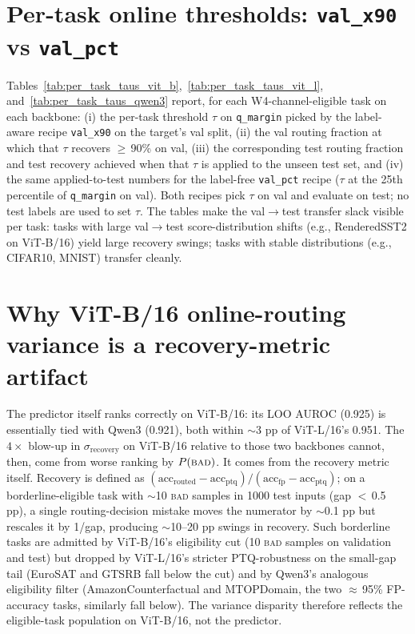 \documentclass{article}
\newcommand{\bad}{\textsc{bad}\xspace}
\begin{document}
\section{Per-task online thresholds: \texttt{val\_x90} vs \texttt{val\_pct}}\label{app:per_task_taus}

Tables~\ref{tab:per_task_taus_vit_b},~\ref{tab:per_task_taus_vit_l}, and~\ref{tab:per_task_taus_qwen3} report, for each W4-channel-eligible task on each backbone: (i) the per-task threshold $\tau$ on \texttt{q\_margin} picked by the label-aware recipe \texttt{val\_x90} on the target's val split, (ii) the val routing fraction at which that $\tau$ recovers $\geq$\,90\% on val, (iii) the corresponding test routing fraction and test recovery achieved when that $\tau$ is applied to the unseen test set, and (iv) the same applied-to-test numbers for the label-free \texttt{val\_pct} recipe ($\tau$ at the 25th percentile of \texttt{q\_margin} on val). Both recipes pick $\tau$ on val and evaluate on test; no test labels are used to set $\tau$. The tables make the val$\to$test transfer slack visible per task: tasks with large val$\to$test score-distribution shifts (e.g., RenderedSST2 on ViT-B/16) yield large recovery swings; tasks with stable distributions (e.g., CIFAR10, MNIST) transfer cleanly.



\section{Why ViT-B/16 online-routing variance is a recovery-metric artifact}\label{app:online_noise}

The predictor itself ranks correctly on ViT-B/16: its LOO AUROC (0.925) is essentially tied with Qwen3 (0.921), both within $\sim$3 pp of ViT-L/16's 0.951. The $4\times$ blow-up in $\sigma_{\text{recovery}}$ on ViT-B/16 relative to those two backbones cannot, then, come from worse ranking by $P(\bad)$. It comes from the recovery metric itself. Recovery is defined as $(\mathrm{acc}_{\text{routed}} - \mathrm{acc}_{\text{ptq}})/(\mathrm{acc}_{\text{fp}} - \mathrm{acc}_{\text{ptq}})$; on a borderline-eligible task with $\sim$10 \bad{} samples in 1000 test inputs (gap $<$\,0.5 pp), a single routing-decision mistake moves the numerator by $\sim$0.1 pp but rescales it by 1/gap, producing $\sim$10--20 pp swings in recovery. Such borderline tasks are admitted by ViT-B/16's eligibility cut (10 \bad{} samples on validation and test) but dropped by ViT-L/16's stricter PTQ-robustness on the small-gap tail (EuroSAT and GTSRB fall below the cut) and by Qwen3's analogous eligibility filter (AmazonCounterfactual and MTOPDomain, the two $\approx$\,95\% FP-accuracy tasks, similarly fall below). The variance disparity therefore reflects the eligible-task population on ViT-B/16, not the predictor.
\end{document}
